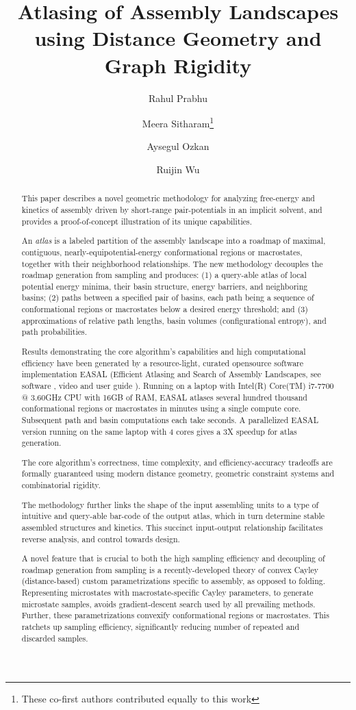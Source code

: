 \documentclass[]{article}
\author{Rahul Prabhu \and Meera Sitharam\footnote{These co-first authors contributed equally to this work} \and Aysegul Ozkan \and Ruijin Wu}
\title{Atlasing of Assembly Landscapes using Distance Geometry and Graph Rigidity}
\begin{document}
\maketitle
\begin{abstract}
\scriptsize{
This paper describes a novel geometric methodology for analyzing free-energy
and kinetics of assembly driven by short-range pair-potentials in an implicit 
solvent, and provides a proof-of-concept illustration of its unique capabilities. 

An \emph{atlas} is a labeled partition of the assembly landscape into a
roadmap of maximal, contiguous, nearly-equipotential-energy
conformational regions or macrostates, together with their neighborhood
relationships. The new methodology decouples the roadmap generation
from sampling and produces: (1) a query-able atlas of local potential
energy minima, their basin structure, energy barriers, and neighboring
basins; (2) paths between a specified pair of basins, each path being a
sequence of conformational regions or macrostates below a desired energy threshold;
and (3) approximations of relative path lengths, basin volumes
(configurational entropy), and path probabilities.
 
Results demonstrating the core algorithm's capabilities and high computational
efficiency have been generated by a resource-light, curated opensource
software implementation EASAL \cite{Ozkan:toms} (Efficient Atlasing and
Search of Assembly Landscapes, see software \cite{easalSoftware}, video \cite{easalVideo}
and user guide \cite{easalUserGuide}). Running
on a laptop with Intel(R) Core(TM) i7-7700 @ 3.60GHz CPU with 16GB of
RAM, EASAL atlases several hundred thousand
conformational regions or macrostates in minutes using a single compute core.
Subsequent path and basin computations each take seconds. A
parallelized EASAL version running on the same laptop with 4 cores
gives a 3X speedup for atlas generation.

The core algorithm's correctness, time complexity, and
efficiency-accuracy tradeoffs are formally guaranteed using modern
distance geometry, geometric constraint systems and combinatorial rigidity. 

The methodology further links the shape of the input 
assembling units to a type of intuitive and query-able bar-code of the
output atlas, which in turn determine stable assembled structures and 
kinetics. This succinct input-output relationship facilitates reverse 
analysis, and control towards design.

A novel feature that is crucial to both the high sampling efficiency and
decoupling of roadmap generation from sampling is a recently-developed
theory of convex Cayley (distance-based) custom parametrizations specific
to assembly, as opposed to folding.  Representing microstates with
macrostate-specific Cayley parameters, to generate microstate samples,
avoids gradient-descent search used by all prevailing methods. 
Further, these parametrizations convexify conformational regions or macrostates. 
This ratchets up sampling efficiency, significantly reducing number of
repeated and discarded samples. 

}
\end{abstract}
\end{document}
